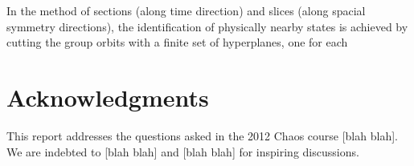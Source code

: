 \documentclass{article}
\begin{document}
In the method of sections (along time direction) and slices (along spacial symmetry directions), the identification of physically nearby states is achieved by cutting the group orbits with a finite set of hyperplanes, one for each 

\section*{Acknowledgments}
This report addresses the questions asked in the  2012 Chaos course
[blah blah]. We are indebted to [blah blah] and [blah blah] for inspiring discussions.




\end{document}
